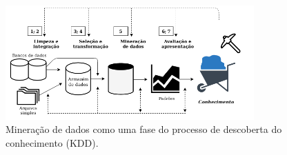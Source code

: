 \begin{figure}[ht]
    \centering
    \caption{Mineração de dados como uma fase do processo de descoberta do conhecimento (KDD).}
    \begin{center}
        \includegraphics[width=0.85\textwidth]{img/based-on-figure-1-4-han-2011.png}
    \end{center}
    \vspace{-0.5cm}
    \label{fig:diagrama-mineração-texto-han}
\end{figure}